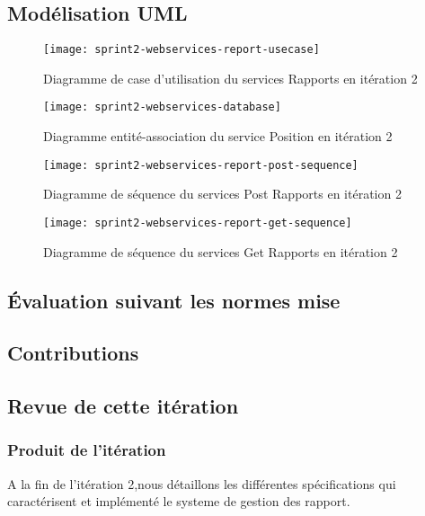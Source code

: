 \subsection{Modélisation UML}

\begin{figure}[htbp]
  \centering
  \texttt{[image: sprint2-webservices-report-usecase]}
  \caption{Diagramme de case d'utilisation du services Rapports en itération 2}
\end{figure}

\begin{figure}[htbp]
    \centering
    \texttt{[image: sprint2-webservices-database]}
    \caption{Diagramme entité-association du service Position en itération 2}
\end{figure}

\begin{figure}[htbp]
  \centering
  \texttt{[image: sprint2-webservices-report-post-sequence]}
  \caption{Diagramme de séquence du services Post Rapports en itération 2}
\end{figure}

\begin{figure}[htbp]
  \centering
  \texttt{[image: sprint2-webservices-report-get-sequence]}
  \caption{Diagramme de séquence du services Get Rapports en itération 2}
\end{figure}

\subsection{Évaluation suivant les normes mise}


\subsection{Contributions}


\subsection{Revue de cette itération}
\subsubsection{Produit de l'itération}

A la fin de l'itération 2,nous détaillons les différentes spécifications qui
caractérisent et implémenté le systeme de gestion des rapport.

